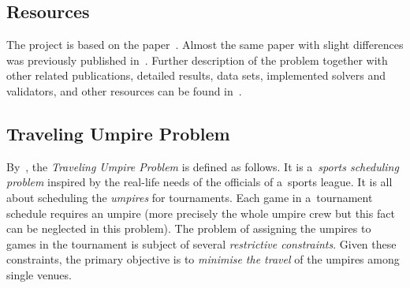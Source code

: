 \documentclass[a4paper, 10pt, twocolumn]{article}
\begin{document}
    \subsection{Resources}
    \label{sec:resources}

    The project is based on the paper~\cite{bendersCutsPaper}. Almost the
    same paper with slight differences was previously published
    in~\cite{bendersCutsCollection}. Further description of the problem
    together with other related publications, detailed results, data sets,
    implemented solvers and validators, and other resources can be found
    in~\cite{tupOnline}.

    \subsection{Traveling Umpire Problem}
    \label{sec:tup}

    By~\cite{bendersCutsPaper, bendersCutsCollection},
    the \emph{Traveling Umpire Problem} is defined as follows. It is
    a~\emph{sports scheduling problem} inspired by the real-life needs of
    the officials of a~sports league. It is all about scheduling the
    \emph{umpires} for tournaments. Each game in a~tournament schedule
    requires an umpire (more precisely the whole umpire crew but this
    fact can be neglected in this problem). The problem of assigning
    the umpires to games in the tournament is subject of several
    \emph{restrictive constraints}. Given these constraints, the primary
    objective is to \emph{minimise the travel} of the umpires among single
    venues.
\end{document}
